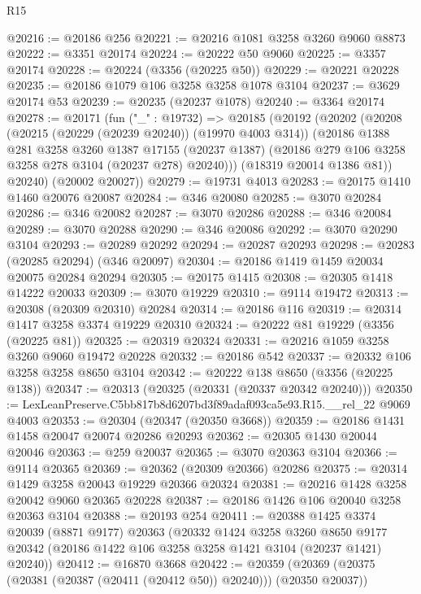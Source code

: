 \begin{lexlean}{R15}
\begin{coremodule}
@20216 := @20186 @256
@20221 := @20216 @1081 @3258 @3260 @9060 @8873
@20222 := @3351 @20174
@20224 := @20222 @50 @9060
@20225 := @3357 @20174
@20228 := @20224 (@3356 (@20225 @50))
@20229 := @20221 @20228
@20235 := @20186 @1079 @106 @3258 @3258 @1078 @3104
@20237 := @3629 @20174 @53
@20239 := @20235 (@20237 @1078)
@20240 := @3364 @20174
@20278 := @20171
    (fun ("_" : @19732) =>
    @20185
      (@20192
        (@20202
          (@20208
            (@20215 (@20229 (@20239 @20240)) (@19970 @4003 @314))
            (@20186
              @1388
              @281
              @3258
              @3260
              @1387
              @17155
              (@20237 @1387)
              (@20186 @279 @106 @3258 @3258 @278 @3104 (@20237 @278) @20240)))
          (@18319 @20014 @1386 @81))
        @20240)
      (@20002 @20027))
@20279 := @19731 @4013
@20283 := @20175 @1410 @1460 @20076 @20087
@20284 := @346 @20080
@20285 := @3070 @20284
@20286 := @346 @20082
@20287 := @3070 @20286
@20288 := @346 @20084
@20289 := @3070 @20288
@20290 := @346 @20086
@20292 := @3070 @20290 @3104
@20293 := @20289 @20292
@20294 := @20287 @20293
@20298 := @20283 (@20285 @20294) (@346 @20097)
@20304 := @20186 @1419 @1459 @20034 @20075 @20284 @20294
@20305 := @20175 @1415
@20308 := @20305 @1418 @14222 @20033
@20309 := @3070 @19229
@20310 := @9114 @19472
@20313 := @20308 (@20309 @20310) @20284
@20314 := @20186 @116
@20319 := @20314 @1417 @3258 @3374 @19229 @20310
@20324 := @20222 @81 @19229 (@3356 (@20225 @81))
@20325 := @20319 @20324
@20331 := @20216 @1059 @3258 @3260 @9060 @19472 @20228
@20332 := @20186 @542
@20337 := @20332 @106 @3258 @3258 @8650 @3104
@20342 := @20222 @138 @8650 (@3356 (@20225 @138))
@20347 := @20313 (@20325 (@20331 (@20337 @20342 @20240)))
@20350 := LexLeanPreserve.C5bb817b8d6207bd3f89adaf093ca5e93.R15.__rel_22 @9069 @4003
@20353 := @20304 (@20347 (@20350 @3668))
@20359 := @20186 @1431 @1458 @20047 @20074 @20286 @20293
@20362 := @20305 @1430 @20044 @20046
@20363 := @259 @20037
@20365 := @3070 @20363 @3104
@20366 := @9114 @20365
@20369 := @20362 (@20309 @20366) @20286
@20375 := @20314 @1429 @3258 @20043 @19229 @20366 @20324
@20381 := @20216 @1428 @3258 @20042 @9060 @20365 @20228
@20387 := @20186 @1426 @106 @20040 @3258 @20363 @3104
@20388 := @20193 @254
@20411 := @20388
    @1425
    @3374
    @20039
    (@8871 @9177)
    @20363
    (@20332
      @1424
      @3258
      @3260
      @8650
      @9177
      @20342
      (@20186 @1422 @106 @3258 @3258 @1421 @3104 (@20237 @1421) @20240))
@20412 := @16870 @3668
@20422 := @20359 (@20369 (@20375 (@20381 (@20387 (@20411 (@20412 @50)) @20240))) (@20350 @20037))

\end{coremodule}
\end{lexlean}
